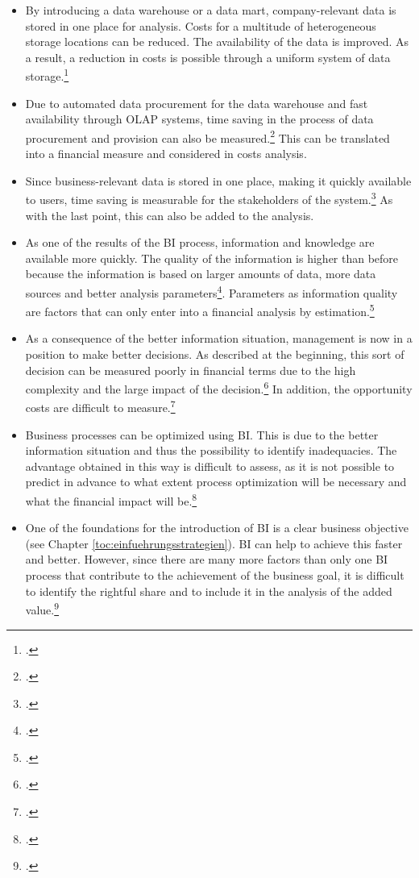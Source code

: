 \begin{itemize}
    \item By introducing a data warehouse or a data mart, company-relevant data is stored in one place for analysis.
    Costs for a multitude of heterogeneous storage locations can be reduced. The availability
    of the data is improved. As a result, a reduction in costs is possible through a uniform system of data storage.\footcite[Cf.][p. 105]{azma2012business}
    \item Due to automated data procurement for the data warehouse and fast availability through \ac{OLAP} systems,
    time saving in the process of data procurement and provision can also be measured.\footcite[Cf.][p. 51]{horakova2013business}
    This can be translated into a financial measure and considered in costs analysis.
    \item Since business-relevant data is stored in one place, making it quickly available to users,
    time saving is measurable for the stakeholders of the system.\footcite[Cf.][p. 97]{williams2003business} As with the
    last point, this can also be added to the analysis.
    \item As one of the results of the BI process, information and knowledge are available more quickly. The quality of the
    information is higher than before because the information is based on larger amounts of data, more data sources and better analysis
    parameters\footcite[Cf.][p. 51]{horakova2013business}. Parameters as information quality are factors
    that can only enter into a financial analysis by estimation.\footcite[Cf.][p. 51]{horakova2013business}
    \item As a consequence of the better information situation, management is now in a position to make better
    decisions. As described at the beginning, this sort of decision can be measured poorly in financial terms due to the high complexity and the large impact of the decision.\footcite[Cf.][p. 51]{horakova2013business}
    In addition, the opportunity costs are difficult to measure.\footcite[Cf.][p. 99]{hovcevar2010assessing}
    \item Business processes can be optimized using \ac{BI}. This is due to the better information situation and
    thus the possibility to identify inadequacies. The advantage obtained in this way is
    difficult to assess, as it is not possible to predict in advance to what extent process optimization will be necessary and what the financial impact will be.\footcite[Cf.][p. 2]{williams2003business}
    \item One of the foundations for the introduction of \ac{BI} is a clear business objective (see Chapter \ref{toc:einfuehrungsstrategien}).
    \ac{BI} can help to achieve this faster and better. However, since there are many more factors than only one \ac{BI} process that contribute to the achievement
    of the business goal, it is difficult to identify the rightful share and to include it in the
    analysis of the added value.\footcite[Cf.][p. 51]{horakova2013business}
\end{itemize}

